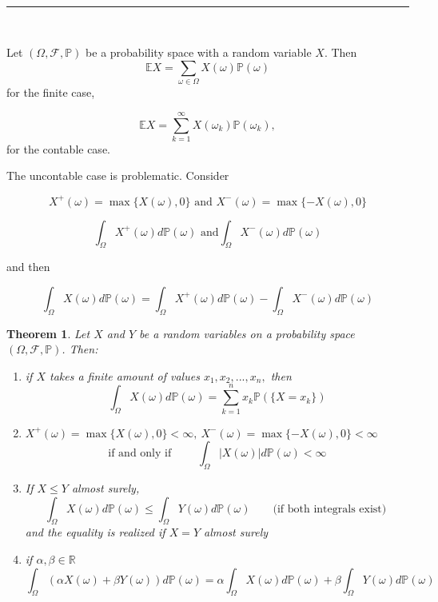 \documentclass[reqno,a4paper,12pt]{amsart}%
\numberwithin{equation}{section}
\newtheorem{theorem}{Theorem}
\theoremstyle{definition}
\newcommand{\Ee}{{\mathbb{E}}}
\newcommand{\Pp}{{\mathbb{P}}}
\newcommand{\Rr}{{\mathbb{R}}}
\begin{document}
\

\begin{center}
	\par\noindent\rule{200pt}{0.1pt}
\end{center}

\

Let $(\Omega, \mathcal{F}, \Pp)$ be a probability space with  a random variable $X$. Then  
$$\Ee X= \sum_{\omega \in \Omega} X(\omega) \Pp (\omega)$$ for the finite case,

$$\Ee X= \sum_{k=1}^\infty X(\omega_k) \Pp (\omega_k),  $$ for the contable case.

The uncontable case is problematic. Consider

$$X^+(\omega)=\max \{X(\omega),0\} \textrm{ and } X^-(\omega)=\max \{-X(\omega),0\} $$

$$\int_\Omega  X^+(\omega) d \Pp (\omega) \textrm{ and} \int_\Omega X^-(\omega) d \Pp (\omega)  $$

and then 

$$ \int_\Omega X(\omega) d \Pp (\omega) = \int_\Omega X^+(\omega) d \Pp (\omega)  -\int_\Omega X^-(\omega) d \Pp (\omega)  $$

 

\begin{theorem}
	Let $X$ and $Y$ be a random variables on a probability space $(\Omega, \mathcal{F}, \Pp)$.
	Then:
	 \begin{enumerate}
		\item 	 if $X$ takes a finite amount of values $x_1, x_2,..., x_n,$ then $$\int_\Omega X(\omega)d \Pp (\omega)= \sum_{k=1}^n x_k \Pp (\{ X= x_k \}) $$
		\item $X^+(\omega)=\max \{X(\omega),0\} < \infty, \ X^-(\omega)=\max \{-X(\omega),0\} < \infty $  $$  \textrm{if and only if } \quad \quad \int_\Omega 	| X(\omega) | d \Pp (\omega)< \infty  $$
		\item  If $X \leq Y$ almost surely, 
		$$  \int_\Omega X(\omega) d \Pp (\omega) \leq \int_\Omega Y(\omega) d \Pp (\omega) \quad \quad  \textrm{(if both integrals exist) }  $$ and the equality is realized if $X=Y$ almost surely	
		\item if $\alpha, \beta \in \Rr$   $$  \int_\Omega (\alpha X(\omega)+ \beta Y(\omega)) d \Pp (\omega)= 	 \alpha\int_\Omega X(\omega) d \Pp (\omega)+ \beta\int_\Omega Y(\omega) d \Pp (\omega)    $$
	\end{enumerate}
\end{theorem}
\end{document}
